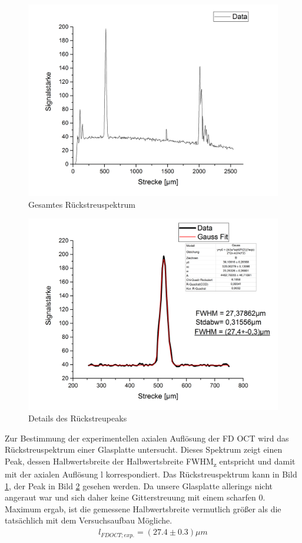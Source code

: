 \documentclass[german, %
parskip=full, %
bibliography=totoc, %
]{scrartcl}
\begin{document}
\begin{figure}[ht]
	\centering
	  \includegraphics[width=\textwidth]{Glasplattenreflex}
  \caption{Gesamtes Rückstreuspektrum}
	\label{fig:Spektrum}
\end{figure}
\begin{figure}[ht]
  \centering
	  \includegraphics[width=\textwidth]{Ergebnis}
	\caption{Details des Rückstreupeaks}
	\label{fig:peak}
\end{figure}

Zur Bestimmung der experimentellen axialen Auflösung der FD OCT wird das Rückstreuspektrum einer Glasplatte untersucht. Dieses Spektrum zeigt einen Peak, dessen Halbwertsbreite der Halbwertsbreite FWHM\textsubscript{z} entspricht und damit mit der axialen Auflösung l korrespondiert. Das Rückstreuspektrum kann in Bild \ref{fig:Spektrum}, der Peak in Bild \ref{fig:peak} gesehen werden. Da unsere Glasplatte allerings nicht angeraut war und sich daher keine Gitterstreuung mit einem scharfen 0. Maximum ergab, ist die gemessene Halbwertsbreite vermutlich größer als die tatsächlich mit dem Versuchsaufbau Mögliche.
\begin{align*}
l_{FD OCT; exp.} = (27.4 \pm 0.3) \mu m
\end{align*}
\end{document}

